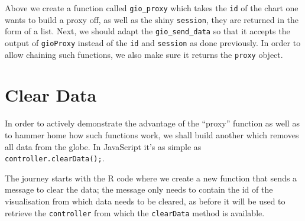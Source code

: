 \documentclass[
]{krantz}
\makeatletter
\newenvironment{Shaded}{\begin{snugshade}}{\end{snugshade}}
\newcommand{\CommentTok}[1]{\textcolor[rgb]{0.37,0.37,0.37}{\textit{#1}}}
\newcommand{\ControlFlowTok}[1]{\textcolor[rgb]{0.27,0.27,0.27}{\textbf{#1}}}
\newcommand{\DataTypeTok}[1]{\textcolor[rgb]{0.27,0.27,0.27}{#1}}
\newcommand{\DecValTok}[1]{\textcolor[rgb]{0.06,0.06,0.06}{#1}}
\newcommand{\KeywordTok}[1]{\textcolor[rgb]{0.27,0.27,0.27}{\textbf{#1}}}
\newcommand{\NormalTok}[1]{#1}
\newcommand{\OperatorTok}[1]{\textcolor[rgb]{0.43,0.43,0.43}{\textbf{#1}}}
\newcommand{\StringTok}[1]{\textcolor[rgb]{0.5,0.5,0.5}{#1}}
\newenvironment{kframe}{%
\medskip{}
\setlength{\fboxsep}{.8em}
 \def\at@end@of@kframe{}%
 \ifinner\ifhmode%
  \def\at@end@of@kframe{\end{minipage}}%
  \begin{minipage}{\columnwidth}%
 \fi\fi%
 \def\FrameCommand##1{\hskip\@totalleftmargin \hskip-\fboxsep
 \colorbox{shadecolor}{##1}\hskip-\fboxsep
     \hskip-\linewidth \hskip-\@totalleftmargin \hskip\columnwidth}%
 \MakeFramed {\advance\hsize-\width
   \@totalleftmargin\z@ \linewidth\hsize
   \@setminipage}}%
 {\par\unskip\endMakeFramed%
 \at@end@of@kframe}
\renewenvironment{Shaded}{\begin{kframe}}{\end{kframe}}
\makeatother
\begin{document}
Above we create a function called \texttt{gio\_proxy} which takes the \texttt{id} of the chart one wants to build a proxy off, as well as the shiny \texttt{session}, they are returned in the form of a list. Next, we should adapt the \texttt{gio\_send\_data} so that it accepts the output of \texttt{gioProxy} instead of the \texttt{id} and \texttt{session} as done previously. In order to allow chaining such functions, we also make sure it returns the \texttt{proxy} object.

\begin{Shaded}
\end{Shaded}

\hypertarget{shiny-widgets-clear-data}{%
\section{Clear Data}\label{shiny-widgets-clear-data}}

In order to actively demonstrate the advantage of the ``proxy'' function as well as to hammer home how such functions work, we shall build another which removes all data from the globe. In JavaScript it's as simple as \texttt{controller.clearData();}.

The journey starts with the R code where we create a new function that sends a message to clear the data; the message only needs to contain the id of the visualisation from which data needs to be cleared, as before it will be used to retrieve the \texttt{controller} from which the \texttt{clearData} method is available.

\begin{Shaded}
\end{Shaded}
\end{document}
